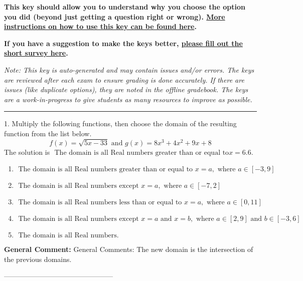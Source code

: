 \documentclass{extbook}[14pt]
\begin{document}
\textbf{This key should allow you to understand why you choose the option you did (beyond just getting a question right or wrong). \href{https://xronos.clas.ufl.edu/mac1105spring2020/courseDescriptionAndMisc/Exams/LearningFromResults}{More instructions on how to use this key can be found here}.}

\textbf{If you have a suggestion to make the keys better, \href{https://forms.gle/CZkbZmPbC9XALEE88}{please fill out the short survey here}.}

\textit{Note: This key is auto-generated and may contain issues and/or errors. The keys are reviewed after each exam to ensure grading is done accurately. If there are issues (like duplicate options), they are noted in the offline gradebook. The keys are a work-in-progress to give students as many resources to improve as possible.}

\rule{\textwidth}{0.4pt}

1. Multiply the following functions, then choose the domain of the resulting function from the list below.
\[ f(x) = \sqrt{5x-33}  \text{ and } g(x) = 8x^{3} +4 x^{2} +9 x + 8 \] 
The solution is $ \text{ The domain is all Real numbers greater than or equal to} x = 6.6. $ 

\begin{enumerate}[label=\Alph*.] 
\item $ \text{ The domain is all Real numbers greater than or equal to } x = a, \text{ where } a \in [-3, 9] $ 

  
\item $ \text{ The domain is all Real numbers except } x = a, \text{ where } a \in [-7, 2] $ 

  
\item $ \text{ The domain is all Real numbers less than or equal to } x = a, \text{ where } a \in [0, 11] $ 

  
\item $ \text{ The domain is all Real numbers except } x = a \text{ and } x = b, \text{ where } a \in [2, 9] \text{ and } b \in [-3, 6] $ 

  
\item $ \text{ The domain is all Real numbers. } $ 

  
\end{enumerate} 
 
\textbf{General Comment:} General Comments: The new domain is the intersection of the previous domains. 

-----------------------------------------------
\end{document}
